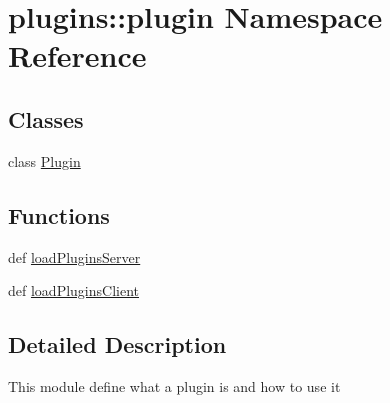 \hypertarget{namespaceplugins_1_1plugin}{\section{plugins\-:\-:plugin \-Namespace \-Reference}
\label{namespaceplugins_1_1plugin}
}
\subsection*{\-Classes}
\begin{DoxyCompactItemize}
\item 
class \hyperlink{classplugins_1_1plugin_1_1_plugin}{\-Plugin}
\end{DoxyCompactItemize}
\subsection*{\-Functions}
\begin{DoxyCompactItemize}
\item 
def \hyperlink{namespaceplugins_1_1plugin_a45e7c249e1f1dd0b6dc1cea7b8b7338c}{load\-Plugins\-Server}
\item 
def \hyperlink{namespaceplugins_1_1plugin_a81b6d893f905c2d746a7bf04d3fe5c1d}{load\-Plugins\-Client}
\end{DoxyCompactItemize}


\subsection{\-Detailed \-Description}
\begin{DoxyVerb}
    This module define what a plugin is and how to use it
\end{DoxyVerb}
 

